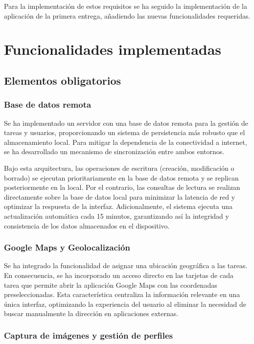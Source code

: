 \documentclass{article}
\begin{document}
Para la implementación de estos requisitos se ha seguido la implementación de la aplicación de la primera entrega, añadiendo las nuevas funcionalidades requeridas.

\section{Funcionalidades implementadas}


\subsection{Elementos obligatorios}


\subsubsection{Base de datos remota}

Se ha implementado un servidor con una base de datos remota para la gestión de tareas y usuarios, proporcionando un sistema de persistencia más robusto que el almacenamiento local. Para mitigar la dependencia de la conectividad a internet, se ha desarrollado un mecanismo de sincronización entre ambos entornos.

Bajo esta arquitectura, las operaciones de escritura (creación, modificación o borrado) se ejecutan prioritariamente en la base de datos remota y se replican posteriormente en la local. Por el contrario, las consultas de lectura se realizan directamente sobre la base de datos local para minimizar la latencia de red y optimizar la respuesta de la interfaz. Adicionalmente, el sistema ejecuta una actualización automática cada 15 minutos, garantizando así la integridad y consistencia de los datos almacenados en el dispositivo.

\subsubsection{Google Maps y Geolocalización}

Se ha integrado la funcionalidad de asignar una ubicación geográfica a las tareas. En consecuencia, se ha incorporado un acceso directo en las tarjetas de cada tarea que permite abrir la aplicación Google Maps con las coordenadas preseleccionadas. Esta característica centraliza la información relevante en una única interfaz, optimizando la experiencia del usuario al eliminar la necesidad de buscar manualmente la dirección en aplicaciones externas.

\subsubsection{Captura de imágenes y gestión de perfiles}
\end{document}
